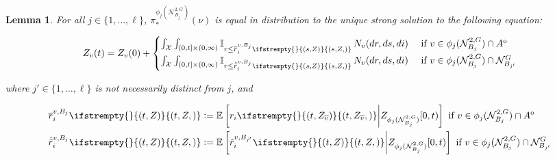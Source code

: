 \documentclass[12pt]{article}
\newcommand{\mb}{\mathbb}
\newcommand{\mc}{\mathcal}
\newcommand{\ov}{\overline}
\newcommand{\te}{\text}
\newcommand{\ex}[1]{\mb{E}\left[#1\right]}			%
\newcommand{\defeq}{:=}								%
\newcommand{\sta}{\mc{X}}							%
\newcommand{\gneigh}[2]{\mc{N}^{#1}_{#2}}			%
\newcommand{\dgneigh}[2]{\mc{N}^{2,#1}_{#2}}		%
\newcommand{\cl}[1]{\ov{#1}}						%
\newcommand{\poiss}{N}								%
\newcommand{\rate}{r}								%
\newcommand{\proj}{\pi}								%
\newcommand{\poissv}[1]{_{#1}}						%
\newcommand{\vind}[1]{_{#1}}						%
\newcommand{\tme}[1]{(#1)}							%
\newcommand{\tmi}[1]{#1}							%
\newcommand{\vpara}[1]{^{#1}}						%
\newcommand{\stpara}[1]{_{#1}}						%
\newcommand{\psf}{_*}								%
\newcommand{\psize}{\ell}							%
\newcommand{\tmepro}[3]{
\ifstrempty{#3}{
	\left(#1,#2\right)}{
	\left(#1,#2,#3\right)}}							%
\newcommand{\brate}{\alt{\rate}}					%
\newcommand{\inte}[1]{{#1}^\mathrm{o}}				%
\newcommand{\alt}[1]{\tilde{#1}}					%
\newcommand{\mm}{\nu}								%
\newcommand{\Xh}{Z}									%
\newcommand{\bgrate}{\ov{\rate}}					%
\newcommand{\bcrate}{\hat{\brate}}					%
\newcommand{\vjpara}[2]{^{#1,#2}}					%
\newtheorem{lem}[thms]{Lemma}
\begin{document}
\begin{lem}
For all \(j \in \{1,\dots,\psize\}\), \(\proj\psf\vpara{\phi_j(\dgneigh{G}{B_j})}(\mm)\) is equal in distribution to the unique strong solution to the following equation:

\begin{equation}
\Xh\vind{v}\tme{t} = \Xh\vind{v}\tme{0} + \begin{cases}
\int_\sta\int_{(0,t]\times (0,\infty)} \mb{I}_{r \leq \bgrate\vjpara{v}{B_j}\stpara{i}\tmepro{s}{\Xh}{}}\,\poiss\poissv{v}(dr,ds,di)&\te{ if } v \in \phi_j(\dgneigh{G}{B_j})\cap \inte{A}\\
\int_\sta\int_{(0,t]\times (0,\infty)} \mb{I}_{r \leq \bcrate\vjpara{v}{B_j}\stpara{i}\tmepro{s}{\Xh}{}}\,\poiss\poissv{v}(dr,ds,di)&\te{ if } v \in \phi_j(\dgneigh{G}{B_j})\cap\gneigh{G}{B_{j'}}
\end{cases}
\label{Uq::marg1eqn}
\end{equation}

where \(j' \in \{1,\dots,\psize\}\) is not necessarily distinct from \(j\), and

\begin{align}
\bgrate\vjpara{v}{B_j}\stpara{i}\tmepro{t}{\Xh}{} &\defeq \ex{\rate\stpara{i}\tmepro{t}{\Xh\vind{\cl{v}}}{}\middle|\Xh\vind{\phi_j(\dgneigh{G}{B_j})}\tmi{[0,t)}} \te{ if } v \in  \phi_j(\dgneigh{G}{B_j})\cap \inte{A} \label{Uq::brrt}\\
\bcrate\vjpara{v}{B_j}\stpara{i}\tmepro{t}{\Xh}{} &\defeq \ex{\brate\vjpara{v}{B_{j'}}\stpara{i}\tmepro{t}{\Xh}{}\middle| \Xh\vind{\phi_j(\dgneigh{G}{B_j})}\tmi{[0,t)}} \te{ if } v \in \phi_j(\dgneigh{G}{B_j})\cap\gneigh{G}{B_{j'}}\label{Uq::brcdrt}
\end{align}
\label{Uq::marg}
\end{lem}
\end{document}
